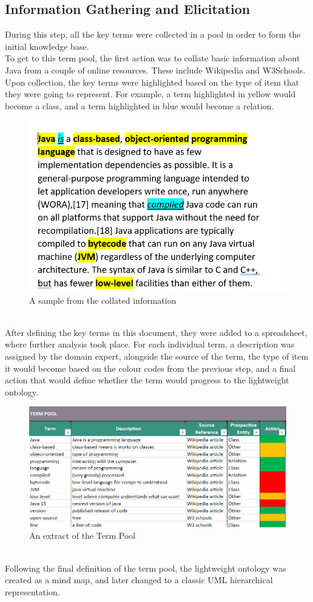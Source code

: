\documentclass[12pt]{report}
\begin{document}
	\subsection{Information Gathering and Elicitation}
	During this step, all the key terms were collected in a pool in order to form the initial knowledge base.\\
	To get to this term pool, the first action was to collate basic information about Java from a couple of online resources. These include Wikipedia and W3Schools. Upon collection, the key terms were highlighted based on the type of item that they were going to represent. For example, a term highlighted in yellow would become a class, and a term highlighted in blue would become a relation.
	\begin{figure}[h!]
	    \centering
	    \includegraphics[scale=0.44]{initialdata.png}
	    \caption{A sample from the collated information}
	    \label{fig:wordfile}
	\end{figure}\\
	After defining the key terms in this document, they were added to a spreadsheet, where further analysis took place. For each individual term, a description was assigned by the domain expert, alongside the source of the term, the type of item it would become based on the colour codes from the previous step, and a final action that would define whether the term would progress to the lightweight ontology.
	\begin{figure}[h!]
	    \centering
	    \includegraphics[scale = 0.65]{spreadsheet.png}
	    \caption{An extract of the Term Pool}
	    \label{fig:termpool}
	\end{figure}\\
	Following the final definition of the term pool, the lightweight ontology was created as a mind map, and later changed to a classic UML hierarchical representation.
\end{document}
